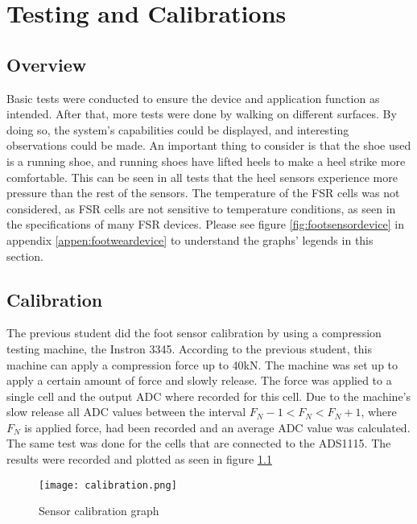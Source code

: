 \graphicspath{{testingandcal/fig/}}

\chapter{Testing and Calibrations}
\label{chap:testing}

\section{Overview}
\label{sec:testingoverview}

Basic tests were conducted to ensure the device and application function as intended. After that, more tests were done by walking on different surfaces. By doing so, the system's capabilities could be displayed, and interesting observations could be made. An important thing to consider is that the shoe used is a running shoe, and running shoes have lifted heels to make a heel strike more comfortable. This can be seen in all tests that the heel sensors experience more pressure than the rest of the sensors. The temperature of the FSR cells was not considered, as FSR cells are not sensitive to temperature conditions, as seen in the specifications of many FSR devices. Please see figure \ref{fig:footsensordevice} in appendix \ref{appen:footweardevice} to understand the graphs' legends in this section.

\section{Calibration}
\label{sec:calibration}

The previous student did the foot sensor calibration by using a compression testing machine, the Instron 3345. According to the previous student, this machine can apply a compression force up to 40kN. The machine was set up to apply a certain amount of force and slowly release. The force was applied to a single cell and the output ADC where recorded for this cell. Due to the machine's slow release all ADC values between the interval $F_N - 1 < F_N < F_N + 1$, where $F_N$ is applied force, had been recorded and an average ADC value was calculated. The same test was done for the cells that are connected to the ADS1115. The results were recorded and plotted as seen in figure \ref{fig:calibration}
\clearpage
\begin{figure}[!htb]
    \centering
    \texttt{[image: calibration.png]}
    \caption{Sensor calibration graph}
    \label{fig:calibration}
\end{figure}

